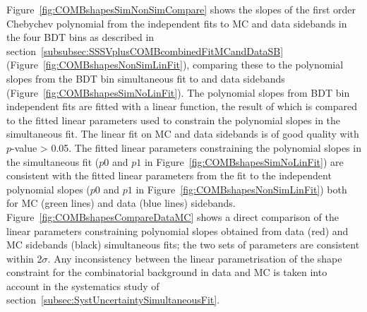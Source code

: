 Figure~\ref{fig:COMBshapesSimNonSimCompare} shows the slopes of the first order Chebychev polynomial from the independent fits to \bbmumuX MC and data sidebands in the four BDT bins as described in section~\ref{subsubsec:SSSVplusCOMBcombinedFitMCandDataSB} (Figure~\ref{fig:COMBshapesNonSimLinFit}), comparing these to the polynomial slopes from the BDT bin simultaneous fit to \bbmumuX and data sidebands (Figure~\ref{fig:COMBshapesSimNoLinFit}). The polynomial slopes from BDT bin independent fits are fitted with a linear function, the result of which is compared to the fitted linear parameters used to constrain the polynomial slopes in the simultaneous fit. The linear fit on MC and data sidebands is of good quality with $p$-value > 0.05. The fitted linear parameters constraining the polynomial slopes in the simultaneous fit ($p0$ and $p1$ in Figure~\ref{fig:COMBshapesSimNoLinFit}) are consistent with the fitted linear parameters from the fit to the independent polynomial slopes ($p0$ and $p1$ in Figure~\ref{fig:COMBshapesNonSimLinFit}) both for MC (green lines) and data (blue lines) sidebands. Figure~\ref{fig:COMBshapesCompareDataMC} shows a direct comparison of the linear parameters constraining polynomial slopes obtained from data (red) and MC sidebands (black) simultaneous fits; the two sets of parameters are consistent within 2$\sigma$. Any inconsistency between the linear parametrisation of the shape constraint for the combinatorial background in data and MC is taken into account in the systematics study of section~\ref{subsec:SystUncertaintySimultaneousFit}. 
